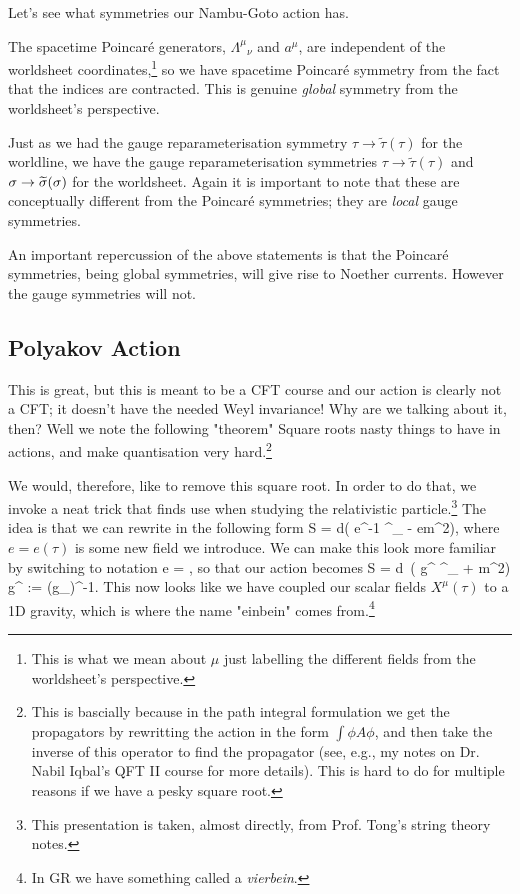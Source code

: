 Let's see what symmetries our Nambu-Goto action has.
\ben[label=(\roman*)]
    \item The spacetime Poincar\'{e} generators, ${\Lambda^{\mu}}_{\nu}$ and $a^{\mu}$, are independent of the worldsheet coordinates,\footnote{This is what we mean about $\mu$ just labelling the different fields from the worldsheet's perspective.} so we have spacetime Poincar\'{e} symmetry from the fact that the indices are contracted. This is genuine \textit{global} symmetry from the worldsheet's perspective. 
    \item Just as we had the gauge reparameterisation symmetry $\tau\to\widetilde{\tau}(\tau)$ for the worldline, we have the gauge reparameterisation symmetries $\tau\to\widetilde{\tau}(\tau)$ and $\sigma\to\widetilde{\sigma}(\sigma)$ for the worldsheet. Again it is important to note that these are conceptually different from the Poincar\'{e} symmetries; they are \textit{local} gauge symmetries.
\een 

\badr 
    An important repercussion of the above statements is that the Poincar\'{e} symmetries, being global symmetries, will give rise to Noether currents. However the gauge symmetries will not. 
\eadr 

\subsection{Polyakov Action}

This is great, but this is meant to be a CFT course and our action is clearly not a CFT; it doesn't have the needed Weyl invariance! Why are we talking about it, then? Well we note the following "theorem"
\bt 
    Square roots nasty things to have in actions, and make quantisation very hard.\footnote{This is bascially because in the path integral formulation we get the propagators by rewritting the action in the form $\int \phi A \phi$, and then take the inverse of this operator to find the propagator (see, e.g., my notes on Dr. Nabil Iqbal's QFT II course for more details). This is hard to do for multiple reasons if we have a pesky square root.}
\et 

We would, therefore, like to remove this square root. In order to do that, we invoke a neat trick that finds use when studying the relativistic particle.\footnote{This presentation is taken, almost directly, from Prof. Tong's string theory notes.} The idea is that we can rewrite  in the following form 
\bse 
    S = \int d\tau \big( e^{-1} ^{\mu}_{\mu} - em^2\big),
\ese
where $e=e(\tau)$ is some new field we introduce. We can make this look more familiar by switching to notation 
\bse 
    e = \sqrt{-\g_{\tau\tau}},
\ese 
so that our action becomes 
\bse 
    S = \int d\tau \,  \big( g^{\tau\tau} ^{\mu}_{\mu} + m^2\big) \qquad g^{\tau\tau} := (g_{\tau\tau})^{-1}.
\ese 
This now looks like we have coupled our scalar fields $X^{\mu}(\tau)$ to a 1D gravity, which is where the name "einbein" comes from.\footnote{In GR we have something called a \textit{vierbein}.} 

